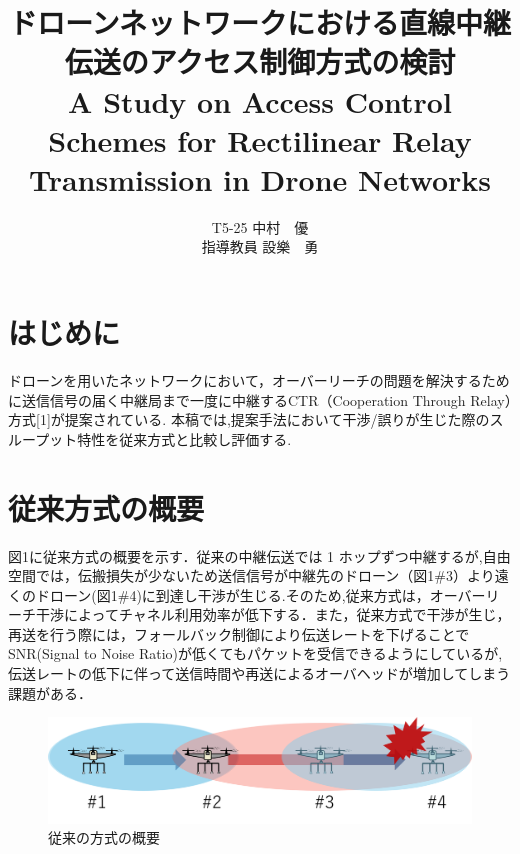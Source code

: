 \documentclass[a4paper,10pt]{ltjsarticle}
\title{\huge ドローンネットワークにおける直線中継伝送のアクセス制御方式の検討\\
\Large A Study on Access Control Schemes for Rectilinear Relay Transmission in Drone Networks
}
\author{
T5-25 \:中村　優\\
指導教員 \: 設樂　勇
}
\date{}
\begin{document}
\twocolumn[
\maketitle
]

\section{はじめに}
ドローンを用いたネットワークにおいて，オーバーリーチの問題を解決するために送信信号の届く中継局まで一度に中継するCTR（Cooperation Through Relay）方式[1]が提案されている. 本稿では,提案手法において干渉/誤りが生じた際のスループット特性を従来方式と比較し評価する.
\section{従来方式の概要}
図1に従来方式の概要を示す．従来の中継伝送では 1 ホップずつ中継するが,自由空間では，伝搬損失が少ないため送信信号が中継先のドローン（図1\#3）より遠くのドローン(図1\#4)に到達し干渉が生じる.そのため,従来方式は，オーバーリーチ干渉によってチャネル利用効率が低下する．また，従来方式で干渉が生じ，再送を行う際には，フォールバック制御により伝送レートを下げることでSNR(Signal to Noise Ratio)が低くてもパケットを受信できるようにしているが,伝送レートの低下に伴って送信時間や再送によるオーバヘッドが増加してしまう課題がある．%

\begin{figure}[H]
  \centering
  \includegraphics[width=\linewidth]{cenventional_topology.png} %
  \caption{従来の方式の概要}
  \label{fig:従来の方式のトポロジー} %
\end{figure}
\end{document}
